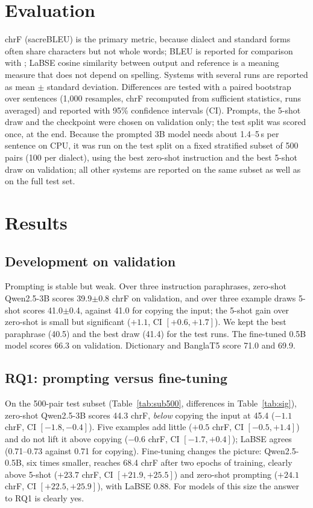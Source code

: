 \documentclass[10pt,twocolumn]{article}
\newcommand{\pmsd}[1]{{\scriptsize$\pm$#1}}
\begin{document}
\section{Evaluation}
chrF \cite{chrf} (sacreBLEU) is the primary metric, because dialect and standard forms often share
characters but not whole words; BLEU is reported for comparison with \cite{vashantor}; LaBSE \cite{labse}
cosine similarity between output and reference is a meaning measure that does not depend on spelling.
Systems with several runs are reported as mean $\pm$ standard deviation. Differences are tested with a
paired bootstrap over sentences (1,000 resamples, chrF recomputed from sufficient statistics, runs averaged)
and reported with 95\% confidence intervals (CI). Prompts, the 5-shot draw and the checkpoint were chosen on
validation only; the test split was scored once, at the end. Because the prompted 3B model needs about
1.4--5\,s per sentence on CPU, it was run on the test split on a fixed stratified subset of 500 pairs
(100 per dialect), using the best zero-shot instruction and the best 5-shot draw on validation; all other
systems are reported on the same subset as well as on the full test set.

\section{Results}
\subsection{Development on validation}
Prompting is stable but weak. Over three instruction paraphrases, zero-shot Qwen2.5-3B scores
39.9\pmsd{0.8} chrF on validation, and over three example draws 5-shot scores 41.0\pmsd{0.4}, against 41.0
for copying the input; the 5-shot gain over zero-shot is small but significant ($+1.1$, CI $[+0.6, +1.7]$).
We kept the best paraphrase (40.5) and the best draw (41.4) for the test runs. The fine-tuned 0.5B model
scores 66.3 on validation. Dictionary and BanglaT5 score 71.0 and 69.9.




\subsection{RQ1: prompting versus fine-tuning}
On the 500-pair test subset (Table~\ref{tab:sub500}, differences in Table~\ref{tab:sig}), zero-shot
Qwen2.5-3B scores 44.3 chrF, \emph{below} copying the input at 45.4 ($-1.1$ chrF, CI $[-1.8, -0.4]$). Five examples
add little ($+0.5$ chrF, CI $[-0.5, +1.4]$) and do not lift it above copying ($-0.6$ chrF, CI $[-1.7, +0.4]$); LaBSE agrees (0.71--0.73 against
0.71 for copying). Fine-tuning changes the picture: Qwen2.5-0.5B, six times smaller, reaches 68.4 chrF
after two epochs of training, clearly above 5-shot ($+23.7$ chrF, CI $[+21.9, +25.5]$) and zero-shot prompting ($+24.1$ chrF, CI $[+22.5, +25.9]$), with LaBSE
0.88.
For models of this size the answer to RQ1 is clearly yes.
\end{document}
